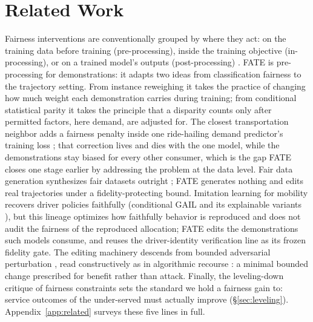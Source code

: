 \section{Related Work}\label{sec:related}

Fairness interventions are conventionally grouped by where they act: on the
training data before training (pre-processing), inside the training
objective (in-processing), or on a trained model's outputs
(post-processing) \cite{barocas2023}. FATE is pre-processing for
demonstrations: it adapts two ideas from classification fairness to the
trajectory setting. From instance reweighing \cite{kamirancalders2012} it
takes the practice of changing how much weight each demonstration carries
during training; from conditional statistical parity \cite{corbettdavies2017} it
takes the principle that a disparity counts only after permitted factors,
here demand, are adjusted for. The closest transportation
neighbor adds a fairness penalty inside one ride-hailing demand predictor's
training loss \cite{zheng2023}; that correction lives and dies with the one
model, while the demonstrations stay biased for every other consumer, which
is the gap FATE closes one stage earlier by addressing the problem at the data 
level. Fair data generation synthesizes
fair datasets outright \cite{xu2018fairgan,vanbreugel2021decaf}; FATE
generates nothing and edits real trajectories under a fidelity-protecting bound. Imitation
learning for mobility recovers driver policies faithfully (conditional GAIL
and its explainable variants \cite{zhang2019cgail,zhang2022cgail,pan2020xgail}),
but this lineage optimizes how faithfully behavior is reproduced and does not
audit the fairness of the reproduced allocation; FATE edits the
demonstrations such models consume, and reuses the driver-identity
verification line \cite{ren2020stsiamese} as its frozen fidelity gate. The
editing machinery descends from bounded adversarial perturbation
\cite{goodfellow2015fgsm,kurakin2017ifgsm,hu2023stifgsm}, read
constructively as in algorithmic recourse
\cite{ustun2019recourse,wachter2018counterfactual}: a minimal bounded change
prescribed for benefit rather than attack. Finally, the leveling-down
critique of fairness constraints \cite{parfit1997,mittelstadt2024,zietlow2022}
sets the standard we hold a fairness gain to: service outcomes of the under-served must actually
improve (\S\ref{sec:leveling}). Appendix~\ref{app:related} surveys these five
lines in full.
